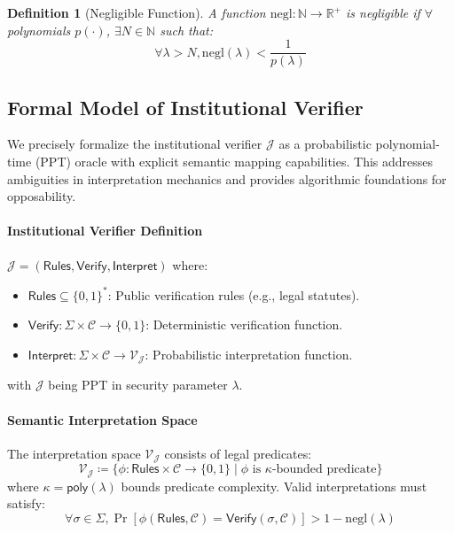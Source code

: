 \documentclass[preprint,12pt]{elsarticle}
\newtheorem{definition}{Definition}[section]
\newcommand{\negl}{\mathrm{negl}}
\begin{document}
            \begin{definition}[Negligible Function]\label{def:negl_function}
                A function $\negl: \mathbb{N} \rightarrow \mathbb{R}^+$ is negligible if $\forall$ polynomials $p(\cdot)$, $\exists N \in \mathbb{N}$ such that:
                \begin{equation}\label{eq:negl_function}
                    \forall \lambda > N, \negl(\lambda) < \frac{1}{p(\lambda)}
                \end{equation}
            \end{definition}

        
        \subsection{Formal Model of Institutional Verifier}\label{subsec:institutional_model}
            We precisely formalize the institutional verifier $\mathcal{J}$ as a probabilistic polynomial-time (PPT) oracle with explicit semantic mapping capabilities. This addresses ambiguities in interpretation mechanics and provides algorithmic foundations for opposability.

            \paragraph{Institutional Verifier Definition}
            $\mathcal{J} = (\mathsf{Rules}, \mathsf{Verify}, \mathsf{Interpret})$ where:
            \begin{itemize}
                \item $\mathsf{Rules} \subseteq \{0,1\}^*$: Public verification rules (e.g., legal statutes).
                \item $\mathsf{Verify}: \Sigma \times \mathcal{C} \rightarrow \{0,1\}$: Deterministic verification function.
                \item $\mathsf{Interpret}: \Sigma \times \mathcal{C} \rightarrow \mathcal{V_J}$: Probabilistic interpretation function.
            \end{itemize}
            with $\mathcal{J}$ being PPT in security parameter $\lambda$.

            \paragraph{Semantic Interpretation Space}
            The interpretation space $\mathcal{V_J}$ consists of legal predicates:
            \begin{equation}\label{eq:sem_interpet_space1}
            \mathcal{V_J} \coloneqq \{\phi : \mathsf{Rules} \times \mathcal{C} \rightarrow \{0,1\} \mid \phi \text{ is } \kappa\text{-bounded predicate}\}
            \end{equation}
            where $\kappa = \mathsf{poly}(\lambda)$ bounds predicate complexity. Valid interpretations must satisfy:
           \begin{equation}\label{eq:sem_interpet_space2}
            \forall \sigma \in \Sigma,  \Pr[\phi(\mathsf{Rules}, \mathcal{C}) = \mathsf{Verify}(\sigma, \mathcal{C})] > 1 - \negl(\lambda)
            \end{equation}
\end{document}
